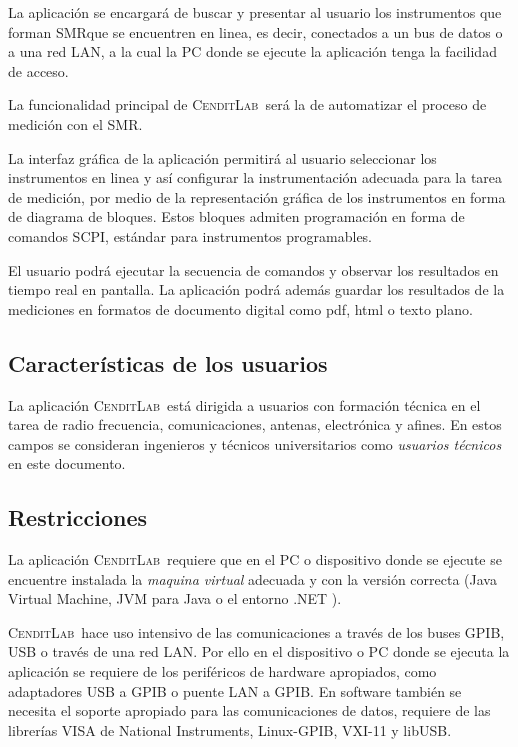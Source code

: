 \documentclass[paper=a4,oneside,fontsize=12pt]{scrartcl}
\newcommand{\AppName}{\textsc{CenditLab}\ }
\newcommand{\SMR}{SMR}
\begin{document}
	La aplicación se encargará de buscar y presentar al usuario los instrumentos que forman \SMR que se encuentren en linea, es decir, conectados a un bus de datos o a una red LAN, a la cual la PC donde se ejecute la aplicación tenga la facilidad de acceso.
	
	La funcionalidad principal de \AppName será la de automatizar el proceso de medición con el  \SMR. 
	
	La interfaz gráfica de la aplicación permitirá al usuario seleccionar los instrumentos en linea y así configurar la instrumentación adecuada para la tarea de medición, por medio de la representación gráfica de los instrumentos en forma de diagrama de bloques. Estos bloques admiten programación en forma de comandos SCPI,  estándar para instrumentos programables.
	
	El usuario podrá ejecutar la secuencia de comandos y observar los resultados en tiempo real en pantalla. La aplicación podrá además guardar los resultados de la mediciones en formatos de documento digital como pdf, html o texto plano.		
	
	\subsection{Características de los usuarios}
	
	La aplicación \AppName está dirigida a usuarios con formación técnica en el tarea de radio frecuencia, comunicaciones, antenas, electrónica y afines. En estos campos se  consideran ingenieros y técnicos universitarios como \emph{usuarios técnicos} en este documento.
	
	\subsection{Restricciones}	
	
	La aplicación \AppName requiere que en el PC o dispositivo donde se ejecute se encuentre instalada la \emph{maquina virtual} adecuada y con la versión correcta (Java Virtual Machine, JVM para Java o el entorno .NET ). 
	
	\AppName hace uso intensivo de las comunicaciones a través de los buses GPIB, USB o través de una red LAN. Por ello en el dispositivo o PC donde se ejecuta la aplicación se requiere de los periféricos de hardware apropiados, como adaptadores USB a GPIB o puente LAN a GPIB. En software también se necesita el soporte apropiado para las comunicaciones de datos, requiere de las librerías VISA de National Instruments, Linux-GPIB, VXI-11 y libUSB.	
\end{document}
